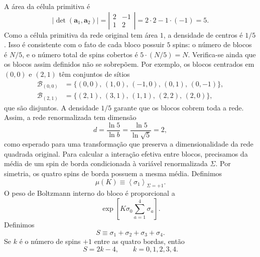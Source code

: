 \documentclass[12pt,a4paper]{article}
\begin{document}
%
A área da célula primitiva é
%
\begin{equation}
    |\det(\mathbf a_1,\mathbf a_2)|
    =
    \left|
    \begin{matrix}
        2 & -1\\
        1 & 2
    \end{matrix}
    \right|
    =
    2\cdot 2-1\cdot(-1)
    =
    5.
\end{equation}
%
Como a célula primitiva da rede original tem área \(1\), a densidade
de centros é \(1/5\). Isso é consistente com o fato de cada bloco
possuir \(5\) spins: o número de blocos é \(N/5\), e o número total
de spins cobertos é \(5\cdot(N/5)=N\). Verifica-se ainda que os blocos assim definidos não se sobrepõem.
Por exemplo, os blocos centrados em \((0,0)\) e \((2,1)\) têm
conjuntos de sítios
%
\begin{align}
    \mathcal B_{(0,0)}
    &=
    \{(0,0),\,(1,0),\,(-1,0),\,(0,1),\,(0,-1)\},
    \\
    \mathcal B_{(2,1)}
    &=
    \{(2,1),\,(3,1),\,(1,1),\,(2,2),\,(2,0)\},
\end{align}
%
que são disjuntos. A densidade \(1/5\) garante que os blocos cobrem
toda a rede. Assim, a rede renormalizada tem dimensão
%
\begin{equation}
    d
    =
    \frac{\ln 5}{\ln b}
    =
    \frac{\ln 5}{\ln\sqrt5}
    =
    2,
    \label{eq:d_p3}
\end{equation}
%
como esperado para uma transformação que preserva a dimensionalidade
da rede quadrada original. Para calcular a interação efetiva entre blocos, precisamos da média
de um spin de borda condicionada à variável renormalizada
\(\Sigma\). Por simetria, os quatro spins de borda possuem a mesma
média. Definimos
%
\begin{equation}
    \mu(K)
    \equiv
    \left\langle
        \sigma_1
    \right\rangle_{\Sigma=+1}.
    \label{eq:mu_def_p3}
\end{equation}
%
O peso de Boltzmann interno do bloco é proporcional a
%
\begin{equation}
    \exp\left[
        K\sigma_0
        \sum_{a=1}^{4}\sigma_a
    \right].
\end{equation}
%
Definimos
%
\begin{equation}
    S\equiv \sigma_1+\sigma_2+\sigma_3+\sigma_4.
\end{equation}
%
Se \(k\) é o número de spins \(+1\) entre as quatro bordas, então
%
\begin{equation}
    S=2k-4,
    \qquad
    k=0,1,2,3,4.
\end{equation}
\end{document}
